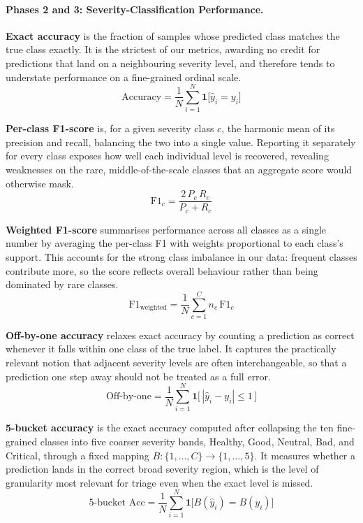 \documentclass[conference]{IEEEtran}
\makeatletter
\let\end\a@l@end
\makeatother
\begin{document}
\paragraph{Phases 2 and 3: Severity-Classification Performance.}
\textbf{Exact accuracy} \cite{sokolova2009systematic} is the fraction of samples whose predicted class matches the true class exactly. It is the strictest of our metrics, awarding no credit for predictions that land on a neighbouring severity level, and therefore tends to understate performance on a fine-grained ordinal scale.
\begin{equation}
\text{Accuracy} = \frac{1}{N}\sum_{i=1}^{N}\mathbf{1}\big[\hat{y}_i = y_i\big]
\end{equation}

\textbf{Per-class F1-score} \cite{sokolova2009systematic} is, for a given severity class $c$, the harmonic mean of its precision and recall, balancing the two into a single value. Reporting it separately for every class exposes how well each individual level is recovered, revealing weaknesses on the rare, middle-of-the-scale classes that an aggregate score would otherwise mask.
\begin{equation}
\text{F1}_c = \frac{2\,P_c\,R_c}{P_c + R_c}
\end{equation}

\textbf{Weighted F1-score} \cite{sokolova2009systematic} summarises performance across all classes as a single number by averaging the per-class F1 with weights proportional to each class's support. This accounts for the strong class imbalance in our data: frequent classes contribute more, so the score reflects overall behaviour rather than being dominated by rare classes.
\begin{equation}
\text{F1}_{\text{weighted}} = \frac{1}{N}\sum_{c=1}^{C} n_c\,\text{F1}_c
\end{equation}

\textbf{Off-by-one accuracy} \cite{baccianella2009evaluation} relaxes exact accuracy by counting a prediction as correct whenever it falls within one class of the true label. It captures the practically relevant notion that adjacent severity levels are often interchangeable, so that a prediction one step away should not be treated as a full error.
\begin{equation}
\text{Off-by-one} = \frac{1}{N}\sum_{i=1}^{N}\mathbf{1}\big[\,|\hat{y}_i - y_i| \le 1\,\big]
\end{equation}

\textbf{5-bucket accuracy} \cite{sokolova2009systematic} is the exact accuracy computed after collapsing the ten fine-grained classes into five coarser severity bands, Healthy, Good, Neutral, Bad, and Critical, through a fixed mapping $B:\{1,\dots,C\}\!\rightarrow\!\{1,\dots,5\}$. It measures whether a prediction lands in the correct broad severity region, which is the level of granularity most relevant for triage even when the exact level is missed.
\begin{equation}
\text{5-bucket Acc} = \frac{1}{N}\sum_{i=1}^{N}\mathbf{1}\big[B(\hat{y}_i) = B(y_i)\big]
\end{equation}
\end{document}
